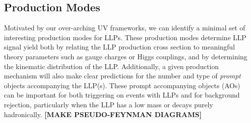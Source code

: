\subsection{Production Modes}

Motivated by our over-arching UV frameworks, we can identify a minimal set of interesting production modes for LLPs.
These production modes determine LLP signal yield both by relating the  LLP production cross section to meaningful theory parameters such as gauge charges or Higgs couplings, and by determining the kinematic distribution of the LLP.  Additionally, a given production mechanism will also  make clear predictions for the number and type of {\em prompt} objects accompanying the LLP(s).  These prompt accompanying objects (AOs) can be important for both triggering on events with LLPs and for background rejection, particularly when the LLP has a low mass or decays purely hadronically.  {\bf [MAKE PSEUDO-FEYNMAN DIAGRAMS]}

